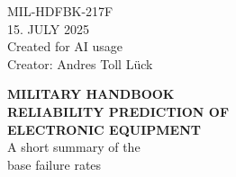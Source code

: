 {\centering
\begin{flushright}
    \begin{minipage}[t]{0.3\textwidth}
        MIL-HDFBK-217F \\
        15. JULY 2025 \\
        Created for AI usage \\
        Creator: Andres Toll Lück
    \end{minipage}
\end{flushright}

\vspace{3cm}

{\fontsize{40pt}{48pt}\selectfont \textbf{MILITARY HANDBOOK}} \\
\vspace{1cm}
{\fontsize{28pt}{32pt}\selectfont \textbf{RELIABILITY PREDICTION OF}} \\
\vspace{0.3cm}
{\fontsize{28pt}{32pt}\selectfont \textbf{ELECTRONIC EQUIPMENT}} \\
\vspace{3cm}
{\fontsize{16pt}{18pt}\selectfont A short summary of the} \\
{\fontsize{16pt}{18pt}\selectfont base failure rates}
\par}